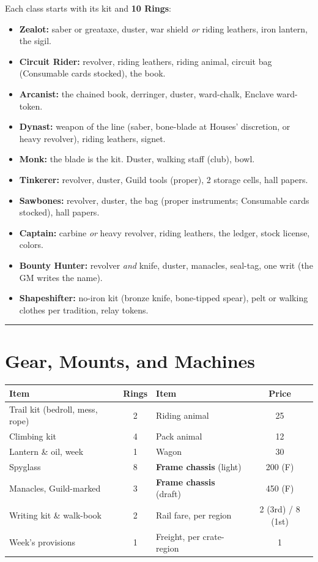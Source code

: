 Each class starts with its kit and \textbf{10 Rings}:

\begin{itemize}
    \item \textbf{Zealot:} saber or greataxe, duster, war shield \textit{or} riding leathers, iron lantern, the sigil.
    \item \textbf{Circuit Rider:} revolver, riding leathers, riding animal, circuit bag (Consumable cards stocked), the book.
    \item \textbf{Arcanist:} the chained book, derringer, duster, ward-chalk, Enclave ward-token.
    \item \textbf{Dynast:} weapon of the line (saber, bone-blade at Houses' discretion, or heavy revolver), riding leathers, signet.
    \item \textbf{Monk:} the blade is the kit. Duster, walking staff (club), bowl.
    \item \textbf{Tinkerer:} revolver, duster, Guild tools (proper), 2 storage cells, hall papers.
    \item \textbf{Sawbones:} revolver, duster, the bag (proper instruments; Consumable cards stocked), hall papers.
    \item \textbf{Captain:} carbine \textit{or} heavy revolver, riding leathers, the ledger, stock license, colors.
    \item \textbf{Bounty Hunter:} revolver \textit{and} knife, duster, manacles, seal-tag, one writ (the GM writes the name).
    \item \textbf{Shapeshifter:} no-iron kit (bronze knife, bone-tipped spear), pelt or walking clothes per tradition, relay tokens.
\end{itemize}

\medskip\hrule\medskip

\section{Gear, Mounts, and Machines}

\begin{center}
\small
\begin{tabular}{l|c||l|c}
\textbf{Item} & \textbf{Rings} & \textbf{Item} & \textbf{Price} \\
\hline
Trail kit (bedroll, mess, rope) & 2 & Riding animal & 25 \\
Climbing kit & 4 & Pack animal & 12 \\
Lantern \& oil, week & 1 & Wagon & 30 \\
Spyglass & 8 & \textbf{Frame chassis} (light) & 200 (F) \\
Manacles, Guild-marked & 3 & \textbf{Frame chassis} (draft) & 450 (F) \\
Writing kit \& walk-book & 2 & Rail fare, per region & 2 (3rd) / 8 (1st) \\
Week's provisions & 1 & Freight, per crate-region & 1 \\
\end{tabular}
\end{center}

